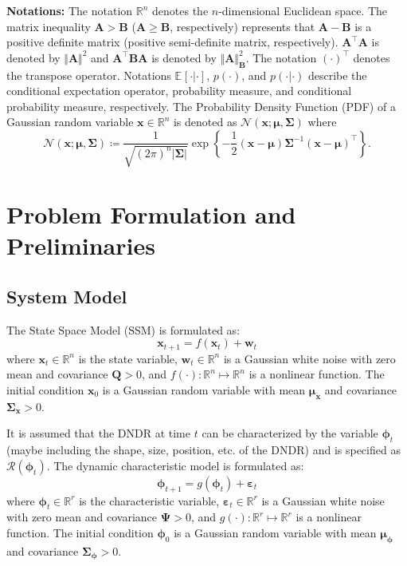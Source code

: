 \documentclass[10pt,twocolumn,twoside]{IEEEtran}
\newcommand{\e}[1]{\exp\left\{#1\right\}}
\newcommand{\E}[2][]{ \mathbb{E}_{#1}\left[#2\right] } %
\newcommand{\fs}{\text{.}} %
\newcommand{\x}{{ \bm{x} }}
\begin{document}
{\bf Notations:}
The notation $\mathbb{R}^n$ denotes the $n$-dimensional Euclidean space. The matrix inequality $\bm{A}>\bm{B}$ ($\bm{A}\geq\bm{B}$, respectively) represents that $\bm{A}-\bm{B}$ is a positive definite matrix (positive semi-definite matrix, respectively).
$\bm{A}^\top\bm{A}$ is denoted by $\Vert\bm{A}\Vert^2$ and $\bm{A}^\top\bm{B}\bm{A}$ is denoted by $\Vert\bm{A}\Vert^2_{\bm{B}}$. The notation $(\cdot)^\top$ denotes the transpose operator. Notations $\E{\cdot|\cdot}$, $p(\cdot)$, and $p(\cdot|\cdot)$ describe the conditional expectation operator, probability measure, and conditional probability measure, respectively. The Probability Density Function (PDF) of a Gaussian random variable $\x\in\mathbb{R}^n$ is denoted as $\mathcal{N}(\bm{x};\bm\mu,\bm\Sigma)$ where
$$
\mathcal{N}(\bm{x};\bm\mu,\bm\Sigma) \coloneqq \frac{1}{\sqrt{(2\pi)^n\vert\bm\Sigma\vert}}\e{-\frac{1}{2}(\bm{x}-\bm\mu)\bm\Sigma^{-1}(\bm{x}-\bm\mu)^\top}\fs
$$

\section{Problem Formulation and Preliminaries} \label{sec:model}

\subsection{System Model}
The State Space Model (SSM) is formulated as:
\begin{equation} \label{eq:SSM} %
\x_{t+1} = f(\x_t) + \bm{w}_t
\end{equation}
where $\x_t\in\mathbb{R}^{n}$ is the state variable, $\bm{w}_t\in\mathbb{R}^n$ is a Gaussian white noise with zero mean and covariance $\bm{Q}>0$, and $f(\cdot):\mathbb{R}^n\mapsto\mathbb{R}^n$ is a nonlinear function. The initial condition $\x_0$ is a Gaussian random variable with mean $\bm{\mu}_{\x}$ and covariance $\bm{\Sigma}_{\x}>0$.

It is assumed that the DNDR at time $t$ can be characterized by the variable $\bm\phi_t$ (maybe including the shape, size, position, etc. of the DNDR) and is specified as $\mathcal{R}(\bm\phi_t)$. The dynamic characteristic model is formulated as:
\begin{equation} \label{eq:DCM} %
\bm\phi_{t+1} = g(\bm\phi_t) + \bm\varepsilon_t
\end{equation}
where $\bm\phi_{t}\in\mathbb{R}^r$ is the characteristic variable,  $\bm{\varepsilon}_t\in\mathbb{R}^r$ is a Gaussian white noise with zero mean and covariance $\bm{\Psi}>0$, and $g(\cdot):\mathbb{R}^r\mapsto\mathbb{R}^r$ is a nonlinear function. The initial condition $\bm\phi_0$ is a Gaussian random variable with mean $\bm{\mu}_{\bm\phi}$ and covariance $\bm{\Sigma}_{\bm\phi}>0$.
\end{document}
